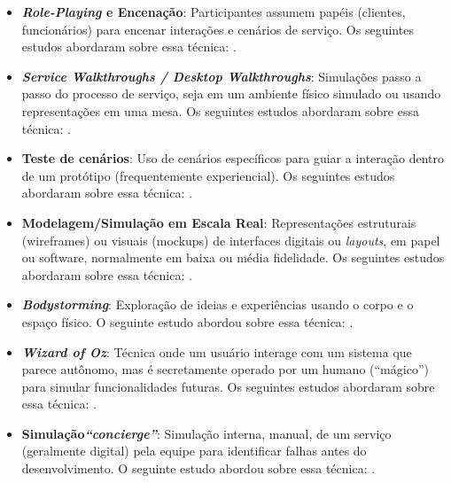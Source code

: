 \begin{itemize}
	\item \textbf{\textit{Role-Playing} e Encenação}: Participantes assumem papéis (clientes, funcionários) para encenar interações e cenários de serviço. Os seguintes estudos abordaram sobre essa técnica: .
	
	\item \textbf{\textit{Service Walkthroughs / Desktop Walkthroughs}}: Simulações passo a passo do processo de serviço, seja em um ambiente físico simulado ou usando representações em uma mesa. Os seguintes estudos abordaram sobre essa técnica: .
	
	\item \textbf{Teste de cenários}: Uso de cenários específicos para guiar a interação dentro de um protótipo (frequentemente experiencial). Os seguintes estudos abordaram sobre essa técnica: .
	
	\item \textbf{Modelagem/Simulação em Escala Real}: Representações estruturais (wireframes) ou visuais (mockups) de interfaces digitais ou \textit{layouts}, em papel ou software, normalmente em baixa ou média fidelidade. Os seguintes estudos abordaram sobre essa técnica: .
	
	\item \textbf{\textit{Bodystorming}}: Exploração de ideias e experiências usando o corpo e o espaço físico. O seguinte estudo abordou sobre essa técnica: .
	
	\item \textbf{\textit{Wizard of Oz}}: Técnica onde um usuário interage com um sistema que parece autônomo, mas é secretamente operado por um humano (``mágico'') para simular funcionalidades futuras. Os seguintes estudos abordaram sobre essa técnica: .
	
	\item \textbf{Simulação\textit{``concierge''}}: Simulação interna, manual, de um serviço (geralmente digital) pela equipe para identificar falhas antes do desenvolvimento. O seguinte estudo abordou sobre essa técnica: .
\end{itemize}

